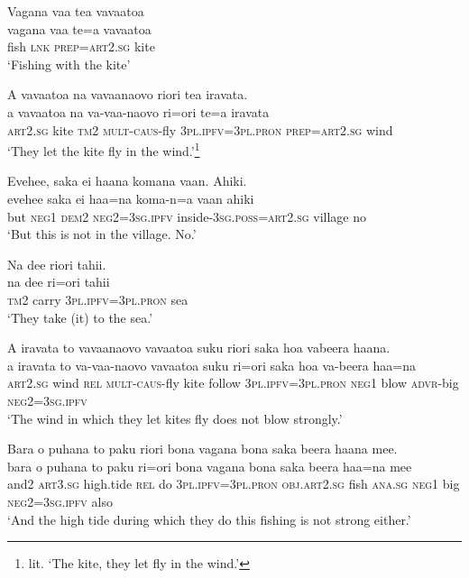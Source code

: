 \ea\label{ex:text27-1}
Vagana vaa tea vavaatoa\\
\gll vagana	vaa	te=a	vavaatoa\\
     fish	\textsc{lnk}	\textsc{prep}=\textsc{art}2.\textsc{sg}	kite\\
\glt `Fishing with the kite'
\z

\ea\label{ex:text27-2}
A vavaatoa na vavaanaovo riori tea iravata.\\
\gll a	vavaatoa	na	va-vaa-naovo	ri=ori	te=a	iravata\\
     \textsc{art}2.\textsc{sg}	kite	\textsc{tm}2	\textsc{mult}-\textsc{caus}-fly	3\textsc{pl}.\textsc{ipfv}=3\textsc{pl}.\textsc{pron}	\textsc{prep}=\textsc{art}2.\textsc{sg}	wind\\
\glt `They let the kite fly in the wind.'\footnote{lit. `The kite, they let fly in the wind.'}
\z

\ea\label{ex:text27-3}
Evehee, saka ei haana komana vaan. Ahiki.\\
\gll evehee	saka	ei	haa=na	koma-n=a	vaan	ahiki\\
     but	\textsc{neg}1	\textsc{dem}2	\textsc{neg}2=3\textsc{sg}.\textsc{ipfv}	inside-3\textsc{sg}.\textsc{poss}=\textsc{art}2.\textsc{sg}	village	no\\
\glt `But this is not in the village. No.'
\z

\ea\label{ex:text27-4}
Na dee riori tahii.\\
\gll na	dee	ri=ori	tahii\\
     \textsc{tm}2	carry	3\textsc{pl}.\textsc{ipfv}=3\textsc{pl}.\textsc{pron}	sea\\
\glt `They take (it) to the sea.'
\z

\ea\label{ex:text27-5}
A iravata to vavaanaovo vavaatoa suku riori saka hoa vabeera haana.\\
\gll a	iravata	to	va-vaa-naovo	vavaatoa	suku	ri=ori	saka	hoa	va-beera	haa=na\\
     \textsc{art}2.\textsc{sg}	wind	\textsc{rel}	\textsc{mult}-\textsc{caus}-fly	kite	follow	3\textsc{pl}.\textsc{ipfv}=3\textsc{pl}.\textsc{pron}	\textsc{neg}1	blow	\textsc{advr}-big	\textsc{neg}2=3\textsc{sg}.\textsc{ipfv}\\
\glt `The wind in which they let kites fly does not blow strongly.'
\z

\ea\label{ex:text27-6}
Bara o puhana to paku riori bona vagana bona saka beera haana mee.\\
\gll bara	o	puhana	to	paku	ri=ori	bona	vagana	bona	saka	beera	haa=na	mee\\
     and2	\textsc{art}3.\textsc{sg}	high.tide	\textsc{rel}	do	3\textsc{pl}.\textsc{ipfv}=3\textsc{pl}.\textsc{pron}	\textsc{obj}.\textsc{art}2.\textsc{sg}	fish	\textsc{ana}.\textsc{sg}	\textsc{neg}1	big	\textsc{neg}2=3\textsc{sg}.\textsc{ipfv}	also\\
\glt `And the high tide during which they do this fishing is not strong either.'
\z


